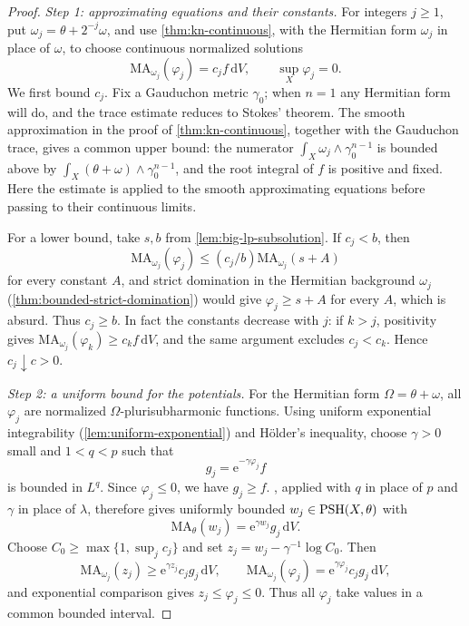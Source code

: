 \begin{proof}
\emph{Step 1: approximating equations and their constants.} For integers $j\geq1$, put $\omega_j=\theta+2^{-j}\omega$, and use \cref{thm:kn-continuous}, with the Hermitian form $\omega_j$ in place of $\omega$, to choose continuous normalized solutions
\[
 \mathrm{MA}_{\omega_j}(\varphi_j)=c_jf\,\mathrm{d}V,
 \qquad \sup_X\varphi_j=0.
\]
We first bound $c_j$. Fix a Gauduchon metric $\gamma_0$; when $n=1$ any Hermitian form will do, and the trace estimate reduces to Stokes' theorem. The smooth approximation in the proof of \cref{thm:kn-continuous}, together with the Gauduchon trace, gives a common upper bound: the numerator $\int_X\omega_j\wedge\gamma_0^{n-1}$ is bounded above by $\int_X(\theta+\omega)\wedge\gamma_0^{n-1}$, and the root integral of $f$ is positive and fixed. Here the estimate is applied to the smooth approximating equations before passing to their continuous limits.

For a lower bound, take $s,b$ from \cref{lem:big-lp-subsolution}. If $c_j<b$, then
\[
 \mathrm{MA}_{\omega_j}(\varphi_j)
 \leq(c_j/b)\mathrm{MA}_{\omega_j}(s+A)
\]
for every constant $A$, and strict domination in the Hermitian background $\omega_j$ (\cref{thm:bounded-strict-domination}) would give $\varphi_j\geq s+A$ for every $A$, which is absurd. Thus $c_j\geq b$. In fact the constants decrease with $j$: if $k>j$, positivity gives $\mathrm{MA}_{\omega_j}(\varphi_k)\geq c_kf\,\mathrm{d}V$, and the same argument excludes $c_j<c_k$. Hence $c_j\downarrow c>0$.

\emph{Step 2: a uniform bound for the potentials.} For the Hermitian form $\Omega=\theta+\omega$, all $\varphi_j$ are normalized $\Omega$-plurisubharmonic functions. Using uniform exponential integrability (\cref{lem:uniform-exponential}) and H\"older's inequality, choose $\gamma>0$ small and $1<q<p$ such that
\[
 g_j=\mathrm{e}^{-\gamma\varphi_j}f
\]
is bounded in $L^q$. Since $\varphi_j\leq0$, we have $g_j\geq f$. , applied with $q$ in place of $p$ and $\gamma$ in place of $\lambda$, therefore gives uniformly bounded $w_j\in\mathrm{PSH}(X,\theta)$ with
\[
 \mathrm{MA}_\theta(w_j)=\mathrm{e}^{\gamma w_j}g_j\,\mathrm{d}V.
\]
Choose $C_0\geq\max\{1,\sup_jc_j\}$ and set $z_j=w_j-\gamma^{-1}\log C_0$. Then
\[
 \mathrm{MA}_{\omega_j}(z_j)
 \geq \mathrm{e}^{\gamma z_j}c_jg_j\,\mathrm{d}V,
 \qquad
 \mathrm{MA}_{\omega_j}(\varphi_j)
       =\mathrm{e}^{\gamma\varphi_j}c_jg_j\,\mathrm{d}V,
\]
and exponential comparison gives $z_j\leq\varphi_j\leq0$. Thus all $\varphi_j$ take values in a common bounded interval.


\end{proof}
